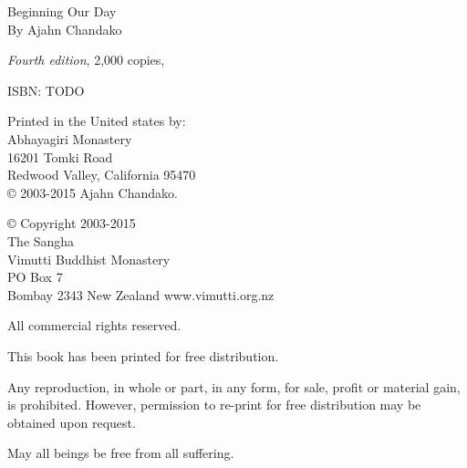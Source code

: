 Beginning Our Day\\
By Ajahn Chandako

\textit{Fourth edition}, 2,000 copies, \the\year

ISBN: TODO

Printed in the United states by:\\
Abhayagiri Monastery\\
16201 Tomki Road\\
Redwood Valley, California 95470\\

© 2003-2015 Ajahn Chandako. 

© Copyright 2003-2015\\
The Sangha\\
Vimutti Buddhist Monastery\\
PO Box 7\\
Bombay 2343 New Zealand
www.vimutti.org.nz

All commercial rights reserved.

This book has been printed for free distribution.

Any reproduction, in whole or part, in any form, for sale, profit or material
gain, is prohibited. However, permission to re-print for free distribution may
be obtained upon request.

May all beings be free from all suffering.
